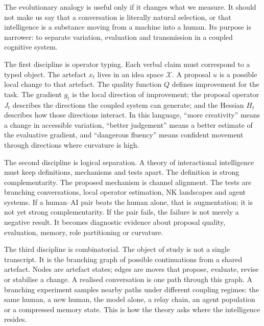 \documentclass[11pt]{article}
\newcommand{\X}{\mathcal{X}}
\begin{document}
The evolutionary analogy is useful only if it changes what we measure. It should not make us say that a conversation is literally natural selection, or that intelligence is a substance moving from a machine into a human. Its purpose is narrower: to separate variation, evaluation and transmission in a coupled cognitive system.

The first discipline is operator typing. Each verbal claim must correspond to a typed object. The artefact $x_t$ lives in an idea space $\X$. A proposal $u$ is a possible local change to that artefact. The quality function $Q$ defines improvement for the task. The gradient $g_t$ is the local direction of improvement; the proposal operator $J_t$ describes the directions the coupled system can generate; and the Hessian $H_t$ describes how those directions interact. In this language, ``more creativity'' means a change in accessible variation, ``better judgement'' means a better estimate of the evaluative gradient, and ``dangerous fluency'' means confident movement through directions where curvature is high.

The second discipline is logical separation. A theory of interactional intelligence must keep definitions, mechanisms and tests apart. The definition is strong complementarity. The proposed mechanism is channel alignment. The tests are branching conversations, local operator estimation, NK landscapes and agent systems. If a human--AI pair beats the human alone, that is augmentation; it is not yet strong complementarity. If the pair fails, the failure is not merely a negative result. It becomes diagnostic evidence about proposal quality, evaluation, memory, role partitioning or curvature.

The third discipline is combinatorial. The object of study is not a single transcript. It is the branching graph of possible continuations from a shared artefact. Nodes are artefact states; edges are moves that propose, evaluate, revise or stabilise a change. A realised conversation is one path through this graph. A branching experiment samples nearby paths under different coupling regimes: the same human, a new human, the model alone, a relay chain, an agent population or a compressed memory state. This is how the theory asks where the intelligence resides.
\end{document}
